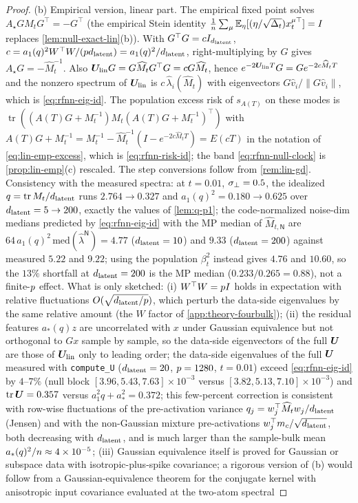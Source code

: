 \begin{proof}
(b) Empirical version, linear part. The empirical fixed point solves $A_\star G\widehat M_tG^{\top}=-G^{\top}$ (the empirical Stein identity $\frac1n\sum_\mu\mathbb{E}_\eta[(\eta/\sqrt{\Delta_t})x_t^{\mu\top}]=I$ replaces \cref{lem:null-exact-lin}(b)). With $G^{\top}G=cI_{d_{\mathrm{latent}}}$, $c=a_1(q)^2W^{\top}W/(pd_{\mathrm{latent}})=a_1(q)^2/d_{\mathrm{latent}}$, right-multiplying by $G$ gives $A_\star G=-\widehat M_t^{-1}$. Also $\bm{U}_{\rm lin}G=G\widehat M_tG^{\top}G=cG\widehat M_t$, hence $e^{-2\bm{U}_{\rm lin}T}G=Ge^{-2c\widehat M_tT}$ and the nonzero spectrum of $\bm{U}_{\rm lin}$ is $c\,\widehat\lambda_i(\widehat M_t)$ with eigenvectors $G\widehat v_i/\|G\widehat v_i\|$, which is \eqref{eq:rfnn-eig-id}. The population excess risk of $s_{A(T)}$ on these modes is $\operatorname{tr}((A(T)G+M_t^{-1})M_t(A(T)G+M_t^{-1})^{\top})$ with $A(T)G+M_t^{-1}=M_t^{-1}-\widehat M_t^{-1}(I-e^{-2c\widehat M_tT})=E(cT)$ in the notation of \eqref{eq:lin-emp-excess}, which is \eqref{eq:rfnn-risk-id}; the band \eqref{eq:rfnn-null-clock} is \cref{prop:lin-emp}(c) rescaled. The step conversions follow from \cref{rem:lin-gd}. Consistency with the measured spectra: at $t=0.01$, $\sigma_{\perp}=0.5$, the idealized $q=\operatorname{tr}M_t/d_{\mathrm{latent}}$ runs $2.764\to0.327$ and $a_1(q)^2=0.180\to0.625$ over $d_{\mathrm{latent}}=5\to200$, exactly the values of \cref{lem:q-p1}; the code-normalized noise-dim medians predicted by \eqref{eq:rfnn-eig-id} with the MP median of $\widehat M_{t,\mathsf N}$ are $64\,a_1(q)^2\,\mathrm{med}(\widehat\lambda^{\mathsf N})=4.77$ ($d_{\mathrm{latent}}=10$) and $9.33$ ($d_{\mathrm{latent}}=200$) against measured $5.22$ and $9.22$; using the population $\beta_t^2$ instead gives $4.76$ and $10.60$, so the $13\%$ shortfall at $d_{\mathrm{latent}}=200$ is the MP median ($0.233/0.265=0.88$), not a finite-$p$ effect. What is only sketched: (i) $W^{\top}W=p I$ holds in expectation with relative fluctuations $O(\sqrt{d_{\mathrm{latent}}/p})$, which perturb the data-side eigenvalues by the same relative amount (the $W$ factor of \cref{app:theory-fourbulk}); (ii) the residual features $a_*(q)z$ are uncorrelated with $x$ under Gaussian equivalence \citep{pennington2017nonlinear,benigni2021eigenvalue,goldt2022gaussian,hu2022universality,mei2022generalization} but not orthogonal to $Gx$ sample by sample, so the data-side eigenvectors of the full $\bm{U}$ are those of $\bm{U}_{\rm lin}$ only to leading order; the data-side eigenvalues of the full $\bm{U}$ measured with \texttt{compute\_U} ($d_{\mathrm{latent}}=20$, $p=1280$, $t=0.01$) exceed \eqref{eq:rfnn-eig-id} by $4$--$7\%$ (null block $[3.96,5.43,7.63]\times10^{-3}$ versus $[3.82,5.13,7.10]\times10^{-3}$) and $\operatorname{tr}\bm{U}=0.357$ versus $a_1^2q+a_*^2=0.372$; this few-percent correction is consistent with row-wise fluctuations of the pre-activation variance $q_j=w_j^{\top}\widehat M_tw_j/d_{\mathrm{latent}}$ (Jensen) and with the non-Gaussian mixture pre-activations $w_j^{\top}m_c/\sqrt{d_{\mathrm{latent}}}$, both decreasing with $d_{\mathrm{latent}}$, and is much larger than the sample-bulk mean $a_*(q)^2/n\approx4\times10^{-5}$; (iii) Gaussian equivalence itself is proved for Gaussian or subspace data with isotropic-plus-spike covariance; a rigorous version of (b) would follow from a Gaussian-equivalence theorem for the conjugate kernel with anisotropic input covariance \citep{hu2022universality,bonnaire2025} evaluated at the two-atom spectral 
\end{proof}
